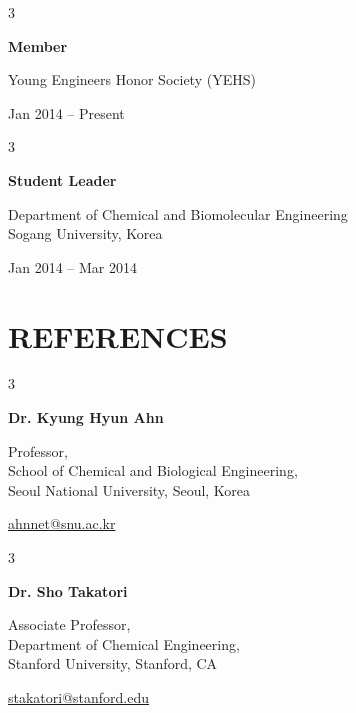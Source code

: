 \documentclass[11pt, a4paper]{article}
\newenvironment{threecolentrywide}[3][]{
    \onecolentry
    \def\thirdColumn{#3}
    \setcolumnwidth{3.5cm, \fill, 2 cm}
    \begin{paracol}{3}
    {\raggedright #2} \switchcolumn
}{
    \switchcolumn \raggedleft \thirdColumn
    \end{paracol}
    \endonecolentry
} %
\newenvironment{threecolentryref}[3][]{
    \onecolentry
    \def\thirdColumn{#3}
    \setcolumnwidth{4.2cm, \fill, 4.2 cm}
    \begin{paracol}{3}
    {\raggedright #2} \switchcolumn
}{
    \switchcolumn \raggedleft \thirdColumn
    \end{paracol}
    \endonecolentry
} %
\let\hrefWithoutArrow\href
\begin{document}


        \begin{threecolentrywide}
            {\textbf{Member}}
            {Jan 2014 – Present}
            {Young Engineers Honor Society (YEHS)}
        \end{threecolentrywide}

        \vspace{0.3cm}

        \begin{threecolentrywide}
            {\textbf{Student Leader}}
            {Jan 2014 – Mar 2014}
            {Department of Chemical and Biomolecular Engineering\\Sogang University, Korea}
        \end{threecolentrywide}

    \section{REFERENCES}
        \begin{threecolentryref}
            {\textbf{Dr. Kyung Hyun Ahn}}
            {\hrefWithoutArrow{ahnnet@snu.ac.kr}{ahnnet@snu.ac.kr}}
            {Professor,\\School of Chemical and Biological Engineering,\\Seoul National University, Seoul, Korea}
        \end{threecolentryref}

        \vspace{0.3cm}

        \begin{threecolentryref}
            {\textbf{Dr. Sho Takatori}}
            {\hrefWithoutArrow{stakatori@stanford.edu}{stakatori@stanford.edu}}
            {Associate Professor,\\Department of Chemical Engineering,\\Stanford University, Stanford, CA}
        \end{threecolentryref}
\end{document}
